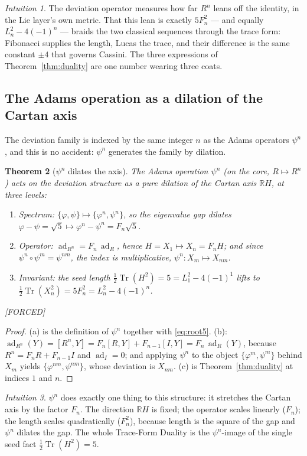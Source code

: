 \documentclass[11pt]{article}
\theoremstyle{plain}
\newtheorem{theorem}{Theorem}[section]
\theoremstyle{definition}
\theoremstyle{remark}
\newtheorem{intuition}[theorem]{Intuition}
\newcommand{\Forced}{\textcolor{forcedc}{[FORCED]}}
\newcommand{\Tr}{\operatorname{Tr}}
\newcommand{\ad}{\operatorname{ad}}
\begin{document}
\begin{intuition}
The deviation operator measures how far $R^{n}$ leans off the identity, in the Lie layer's own metric. That this lean is exactly $5F_n^{2}$ --- and equally $L_n^{2}-4(-1)^{n}$ --- braids the two classical sequences through the trace form: Fibonacci supplies the length, Lucas the trace, and their difference is the same constant $\pm4$ that governs Cassini. The three expressions of Theorem~\ref{thm:duality} are one number wearing three coats.
\end{intuition}

\subsection{The Adams operation as a dilation of the Cartan axis}

The deviation family is indexed by the same integer $n$ as the Adams operators $ψ^{n}$, and this is no accident: $ψ^{n}$ generates the family by dilation.

\begin{theorem}[$ψ^{n}$ dilates the axis]\label{thm:dilation}
The Adams operation $ψ^{n}$ (on the core, $R↦R^{n}$) acts on the deviation structure as a pure dilation of the Cartan axis $ℝH$, at three levels:
\begin{enumerate}[label=\textup{(\alph*)},leftmargin=2em,itemsep=1pt]
\item \emph{Spectrum:} $\{φ,ψ\}↦\{φ^{n},ψ^{n}\}$, so the eigenvalue gap dilates $φ-ψ=\sqrt5↦φ^{n}-ψ^{n}=F_n\sqrt5$.
\item \emph{Operator:} $\ad_{R^{n}}=F_n\,\ad_R$, hence $H=X_1↦X_n=F_nH$; and since $ψ^{n}∘ψ^{m}=ψ^{nm}$, the index is multiplicative, $ψ^{n}\colon X_m↦X_{nm}$.
\item \emph{Invariant:} the seed length $\tfrac12\Tr(H^{2})=5=L_1^{2}-4(-1)^{1}$ lifts to $\tfrac12\Tr(X_n^{2})=5F_n^{2}=L_n^{2}-4(-1)^{n}$.
\end{enumerate}
\Forced
\end{theorem}
\begin{proof}
(a) is the definition of $ψ^{n}$ together with \eqref{eq:root5}. (b): $\ad_{R^{n}}(Y)=[R^{n},Y]=F_n[R,Y]+F_{n-1}[I,Y]=F_n\,\ad_R(Y)$, because $R^{n}=F_nR+F_{n-1}I$ and $\ad_I=0$; and applying $ψ^{n}$ to the object $\{φ^{m},ψ^{m}\}$ behind $X_m$ yields $\{φ^{nm},ψ^{nm}\}$, whose deviation is $X_{nm}$. (c) is Theorem~\ref{thm:duality} at indices $1$ and $n$.
\end{proof}

\begin{intuition}
$ψ^{n}$ does exactly one thing to this structure: it stretches the Cartan axis by the factor $F_n$. The direction $ℝH$ is fixed; the operator scales linearly ($F_n$); the length scales quadratically ($F_n^{2}$), because length is the square of the gap and $ψ^{n}$ dilates the gap. The whole Trace-Form Duality is the $ψ^{n}$-image of the single seed fact $\tfrac12\Tr(H^{2})=5$.
\end{intuition}
\end{document}
